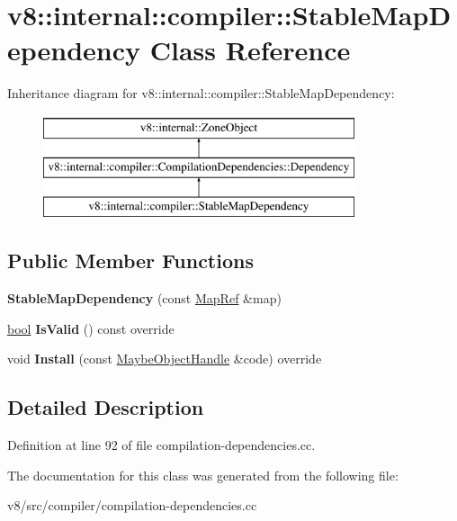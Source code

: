 \hypertarget{classv8_1_1internal_1_1compiler_1_1StableMapDependency}{}\section{v8\+:\+:internal\+:\+:compiler\+:\+:Stable\+Map\+Dependency Class Reference}
\label{classv8_1_1internal_1_1compiler_1_1StableMapDependency}
Inheritance diagram for v8\+:\+:internal\+:\+:compiler\+:\+:Stable\+Map\+Dependency\+:\begin{figure}[H]
\begin{center}
\leavevmode
\includegraphics[height=3.000000cm]{classv8_1_1internal_1_1compiler_1_1StableMapDependency}
\end{center}
\end{figure}
\subsection*{Public Member Functions}
\begin{DoxyCompactItemize}
\item 
\mbox{\label{classv8_1_1internal_1_1compiler_1_1StableMapDependency_a47523ff8824da06c7981ad8a6dd408aa}} 
{\bfseries Stable\+Map\+Dependency} (const \mbox{\hyperlink{classv8_1_1internal_1_1compiler_1_1MapRef}{Map\+Ref}} \&map)
\item 
\mbox{\label{classv8_1_1internal_1_1compiler_1_1StableMapDependency_acc7fc32a95bfa0cbf9db1278caabf94b}} 
\mbox{\hyperlink{classbool}{bool}} {\bfseries Is\+Valid} () const override
\item 
\mbox{\label{classv8_1_1internal_1_1compiler_1_1StableMapDependency_a793b276839a996e95c12300ca7f5677c}} 
void {\bfseries Install} (const \mbox{\hyperlink{classv8_1_1internal_1_1MaybeObjectHandle}{Maybe\+Object\+Handle}} \&code) override
\end{DoxyCompactItemize}


\subsection{Detailed Description}


Definition at line 92 of file compilation-\/dependencies.\+cc.



The documentation for this class was generated from the following file\+:\begin{DoxyCompactItemize}
\item 
v8/src/compiler/compilation-\/dependencies.\+cc\end{DoxyCompactItemize}
